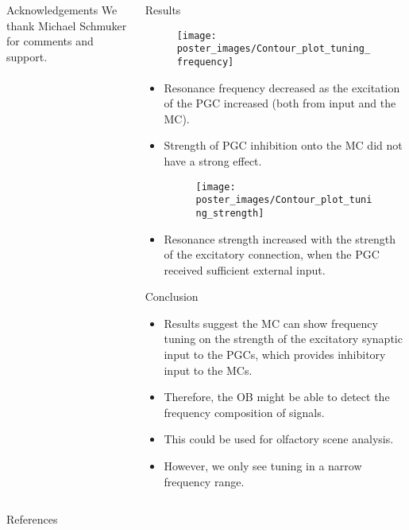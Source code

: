 \documentclass[final,hyperref={pdfpagelabels=false}]{beamer}
\begin{document}
\begin{frame}{}
\begin{columns}[t]
\begin{column}{.48\linewidth}
\begin{block}{Acknowledgements} 
We thank Michael Schmuker for comments and support.
\end{block}

\end{column}
\begin{column}{.48\linewidth}

\begin{block}{Results}
\begin{figure}
\center
\texttt{[image: poster\_images/Contour\_plot\_tuning\_frequency]}
\end{figure}

\begin{itemize}
\item Resonance frequency decreased as the excitation of the PGC increased (both from input and the MC).
\item Strength of PGC inhibition onto the MC did not have a strong effect.

\begin{figure}
\center
\texttt{[image: poster\_images/Contour\_plot\_tuning\_strength]}
\end{figure} 

\item Resonance strength increased with the strength of the excitatory connection, when the PGC received sufficient external input.
\end{itemize}
\end{block}

\begin{block}{Conclusion}
\begin{itemize}
\item Results suggest the MC can show frequency tuning on the strength of the excitatory synaptic input to the PGCs, which provides inhibitory input to the MCs.
\item Therefore, the OB might be able to detect the frequency composition of signals.
\item This could be used for olfactory scene analysis.
\item However, we only see tuning in a narrow frequency range.
\end{itemize}
\end{block}

\end{column}
\end{columns}

\begin{block}{References}
\nocite{*}

{\footnotesize
}
\end{block}

\end{frame}
\end{document}
